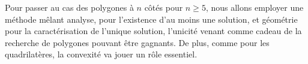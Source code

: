 Pour passer au cas des polygones à $n$ côtés pour $n \geq 5$, nous allons employer une méthode mêlant analyse, pour l'existence d'au moins une solution, et géométrie pour la caractérisation de l'unique solution, l'unicité venant comme cadeau de la recherche de polygones pouvant être gagnants.
%
De plus, comme pour les quadrilatères, la convexité va jouer un rôle essentiel.
